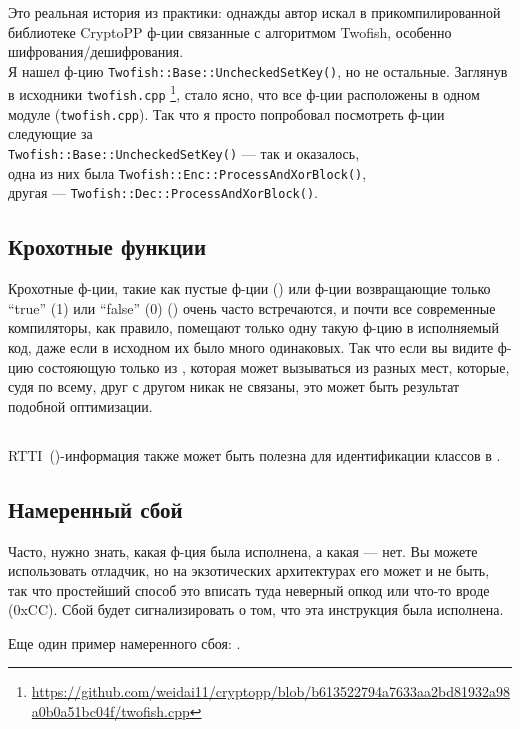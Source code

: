 Это реальная история из практики: однажды автор искал в прикомпилированной библиотеке CryptoPP ф-ции связанные
с алгоритмом Twofish, особенно шифрования/дешифрования.\\
Я нашел ф-цию \verb|Twofish::Base::UncheckedSetKey()|, но не остальные.
Заглянув в исходники \verb|twofish.cpp|
\footnote{\url{https://github.com/weidai11/cryptopp/blob/b613522794a7633aa2bd81932a98a0b0a51bc04f/twofish.cpp}}, стало ясно, что все ф-ции расположены в одном модуле (\verb|twofish.cpp|).
Так что я просто попробовал посмотреть ф-ции следующие за \\
\verb|Twofish::Base::UncheckedSetKey()| --- так и оказалось,\\
одна из них была \verb|Twofish::Enc::ProcessAndXorBlock()|,\\
другая --- \verb|Twofish::Dec::ProcessAndXorBlock()|.

\subsection{Крохотные функции}

Крохотные ф-ции, такие как пустые ф-ции ()
или ф-ции возвращающие только ``true'' (1) или ``false'' (0) () очень часто встречаются,
и почти все современные компиляторы, как правило, помещают только одну такую ф-цию в исполняемый код,
даже если в исходном их было много одинаковых.
Так что если вы видите ф-цию состояющую только из , которая может вызываться из разных мест,
которые, судя по всему, друг с другом никак не связаны, это может быть результат подобной оптимизации.

\subsection{\Cpp}

\ac{RTTI}~()-информация также может быть полезна для идентификации 
классов в \Cpp.

\subsection{Намеренный сбой}

Часто, нужно знать, какая ф-ция была исполнена, а какая --- нет.
Вы можете использовать отладчик, но на экзотических архитектурах его может и не быть, так что простейший способ это вписать
туда неверный опкод или что-то вроде  (0xCC).
Сбой будет сигнализировать о том, что эта инструкция была исполнена.

Еще один пример намеренного сбоя: .

